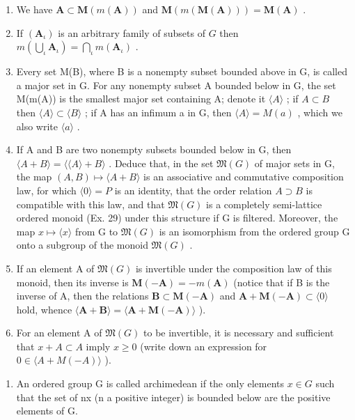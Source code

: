 \begin{enumerate}
\def\labelenumi{\alph{enumi})}
\setcounter{enumi}{1}
\item
  We have \(\mathbf{A} \subset \mathbf{M}(m(\mathbf{A}))\) and \(\mathbf{M}(m(\mathbf{M}(\mathbf{A}))) = \mathbf{M}(\mathbf{A})\) .
\item
  If \((\mathbf{A}_{\iota})\) is an arbitrary family of subsets of \(G\) then \(m\left(\bigcup_{\iota} \mathbf{A}_{\iota}\right) = \bigcap_{\iota} m(\mathbf{A}_{\iota})\) .
\item
  Every set M(B), where B is a nonempty subset bounded above in G, is called a major set in G. For any nonempty subset A bounded below in G, the set M(m(A)) is the smallest major set containing A; denote it \(\langle A\rangle\) ; if \(A\subset B\) then \(\langle A\rangle\subset\langle B\rangle\) ; if A has an infimum a in G, then \(\langle A\rangle=M(a)\) , which we also write \(\langle a\rangle\) .
\item
  If A and B are two nonempty subsets bounded below in G, then \(\langle A + B \rangle = \langle \langle A \rangle + B \rangle\) . Deduce that, in the set \(\mathfrak{M}(G)\) of major sets in G, the map \((A, B) \mapsto \langle A + B \rangle\) is an associative and commutative composition law, for which \(\langle 0 \rangle = P\) is an identity, that the order relation \(A \supset B\) is compatible with this law, and that \(\mathfrak{M}(G)\) is a completely semi-lattice ordered monoid (Ex. 29) under this structure if G is filtered. Moreover, the map \(x \mapsto \langle x \rangle\) from G to \(\mathfrak{M}(G)\) is an isomorphism from the ordered group G onto a subgroup of the monoid \(\mathfrak{M}(G)\) .
\item
  If an element A of \(\mathfrak{M}(G)\) is invertible under the composition law of this monoid, then its inverse is \(\mathbf{M}(-\mathbf{A}) = -m(\mathbf{A})\) (notice that if B is the inverse of A, then the relations \(\mathbf{B} \subset \mathbf{M}(-\mathbf{A})\) and \(\mathbf{A} + \mathbf{M}(-\mathbf{A}) \subset \langle 0 \rangle\) hold, whence \(\langle \mathbf{A} + \mathbf{B} \rangle = \langle \mathbf{A} + \mathbf{M}(-\mathbf{A}) \rangle\) ).
\item
  For an element A of \(\mathfrak{M}(G)\) to be invertible, it is necessary and sufficient that \(x + A \subset A\) imply \(x \geqslant 0\) (write down an expression for \(0 \in \langle A + M(-A) \rangle\) ).
\end{enumerate}

\begin{enumerate}
\def\labelenumi{\arabic{enumi})}
\setcounter{enumi}{30}
\tightlist
\item
  An ordered group G is called archimedean if the only elements \(x \in G\) such that the set of nx (n a positive integer) is bounded below are the positive elements of G.
\end{enumerate}


